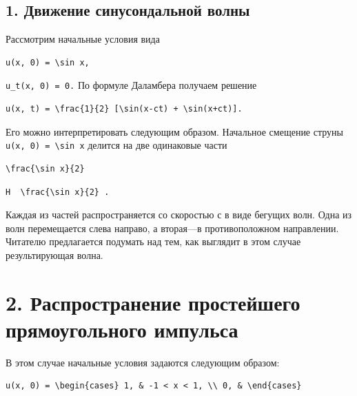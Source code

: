 \documentclass[
  ukrainian,
]{article}
\begin{document}
\subsection{1. Движение синусондальной
волны}\label{ux434ux432ux438ux436ux435ux43dux438ux435-ux441ux438ux43dux443ux441ux43eux43dux434ux430ux43bux44cux43dux43eux439-ux432ux43eux43bux43dux44b}

Рассмотрим начальные условия вида

\begin{verbatim}
u(x, 0) = \sin x,
\end{verbatim}

\texttt{u\_t(x,\ 0)\ =\ 0.} По формуле Даламбера получаем решение

\begin{verbatim}
u(x, t) = \frac{1}{2} [\sin(x-ct) + \sin(x+ct)].
\end{verbatim}

Его можно интерпретировать следующим образом. Начальное смещение струны
\texttt{u(x,\ 0)\ =\ \textbackslash{}sin\ x} делится на две одинаковые
части

\begin{verbatim}
\frac{\sin x}{2}
\end{verbatim}

\texttt{H\ \ \textquotesingle{}\textbackslash{}frac\{\textbackslash{}sin\ x\}\{2\}\textquotesingle{}\ .}

Каждая из частей распространяется со скоростью с в виде бегущих волн.
Одна из волн перемещается слева направо, а вторая---в противоположном
направлении. Читателю предлагается подумать над тем, как выглядит в этом
случае результирующая волна.

\section{2. Распространение простейшего прямоугольного
импульса}\label{ux440ux430ux441ux43fux440ux43eux441ux442ux440ux430ux43dux435ux43dux438ux435-ux43fux440ux43eux441ux442ux435ux439ux448ux435ux433ux43e-ux43fux440ux44fux43cux43eux443ux433ux43eux43bux44cux43dux43eux433ux43e-ux438ux43cux43fux443ux43bux44cux441ux430}

В этом случае начальные условия задаются следующим образом:

\begin{verbatim}
u(x, 0) = \begin{cases} 1, & -1 < x < 1, \\ 0, & \end{cases}
\end{verbatim}
\end{document}
